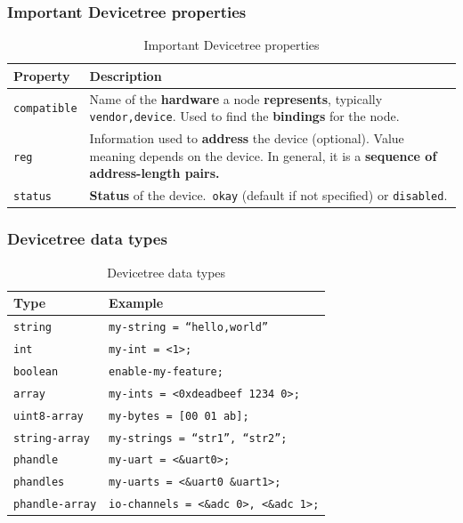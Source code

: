 \documentclass[handout]{beamer}
\begin{document}
\begin{frame}
  \frametitle{Important Devicetree properties}

  \begin{table}
    \centering
    \footnotesize
    \begin{tabular}{lp{}}
      \toprule
      Property            & Description                                        \\
      \midrule
      \texttt{compatible} &                                                    %
      Name of the \textbf{hardware} a node \textbf{represents}, typically
      \texttt{vendor,device}. Used to find the \textbf{bindings} for the node. \\
      \texttt{reg}        &                                                    %
      Information used to \textbf{address} the device (optional). Value
      meaning depends on the device. In general, it is a
      \textbf{sequence of address-length pairs.}                               \\
      \texttt{status}     &                                                    %
      \textbf{Status} of the device.\ \texttt{okay} (default if not specified)
      or \texttt{disabled}.                                                    \\
      \bottomrule
    \end{tabular}
    \caption{Important Devicetree properties}
  \end{table}
\end{frame}

\begin{frame}[fragile]
  \frametitle{Devicetree data types}

  \begin{table}
    \centering
    \begin{tabular}{lp{}}
      \toprule
      Type                   & Example                                      \\
      \midrule
      \texttt{string}        & \texttt{my-string = ``hello,world''}         \\
      \texttt{int}           & \texttt{my-int = <1>;}                       \\
      \texttt{boolean}       & \texttt{enable-my-feature;}                  \\
      \texttt{array}         & \texttt{my-ints = <0xdeadbeef 1234 0>;}      \\
      \texttt{uint8-array}   & \texttt{my-bytes = [00 01 ab];}              \\
      \texttt{string-array}  & \texttt{my-strings = ``str1'', ``str2'';}    \\
      \texttt{phandle}       & \texttt{my-uart = <\&uart0>;}                \\
      \texttt{phandles}      & \texttt{my-uarts = <\&uart0 \&uart1>;}       \\
      \texttt{phandle-array} & \texttt{io-channels = <\&adc 0>, <\&adc 1>;} \\
      \bottomrule
    \end{tabular}
    \caption{Devicetree data types}
  \end{table}
\end{frame}
\end{document}
